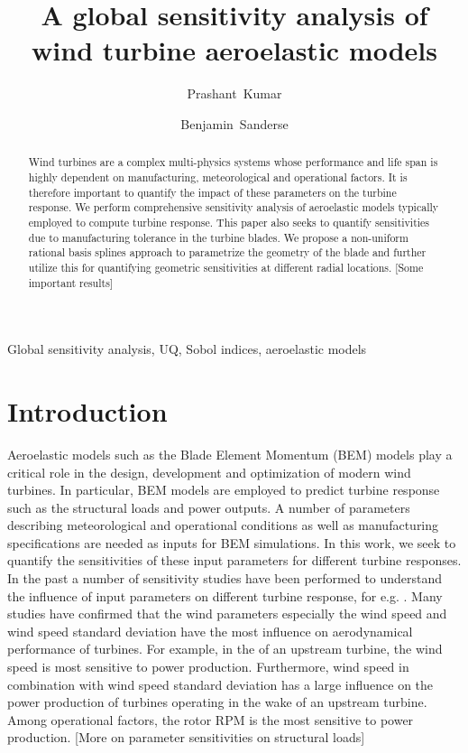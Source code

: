 \documentclass[review]{elsarticle}
\numberwithin{equation}{section}
\numberwithin{equation}{section}
\begin{document}
\begin{frontmatter}
\title{A global sensitivity analysis of wind turbine aeroelastic models}

\author[]{Prashant~Kumar}

\author{Benjamin~Sanderse}

\begin{abstract}
Wind turbines are a complex multi-physics systems whose performance and life span is highly dependent on manufacturing, meteorological and operational factors. It is therefore important to quantify the impact of these parameters on the turbine response. We perform comprehensive sensitivity analysis of aeroelastic models typically employed to compute turbine response. This paper also seeks to quantify sensitivities due to manufacturing tolerance in the turbine blades. We propose a non-uniform rational basis splines approach to parametrize the geometry of the blade and further utilize this for quantifying geometric sensitivities at different radial locations. [Some important results]
\end{abstract}
\begin{keyword}
Global sensitivity analysis, UQ, Sobol indices, aeroelastic models
\end{keyword}
\end{frontmatter}

\linenumbers

\section{Introduction}
Aeroelastic models such as the Blade Element Momentum (BEM) models \cite{HandBook} play a critical role in the design, development and optimization of modern wind turbines. In particular, BEM models are employed to predict turbine response such as the structural loads and power outputs. A number of parameters describing meteorological and operational conditions as well as manufacturing specifications are needed as inputs for BEM simulations. In this work, we seek to quantify the sensitivities of these input parameters for different turbine responses. In the past a number of sensitivity studies have been performed to understand the influence of input parameters on different turbine response, for e.g. \cite{moriarty2002effect, eggers2003wind, McKay2014, dykes2014sensitivity, Robertson2018}. Many studies have confirmed that the wind parameters especially the wind speed and wind speed standard deviation have the most influence on aerodynamical performance of turbines. For example, in the of an upstream turbine, the wind speed is most sensitive to power production. Furthermore, wind speed in combination with wind speed standard deviation has a large influence on the power production of turbines operating in the wake of an upstream turbine. Among operational factors, the rotor RPM is the most sensitive to power production. [More on parameter sensitivities on structural loads]
\end{document}
